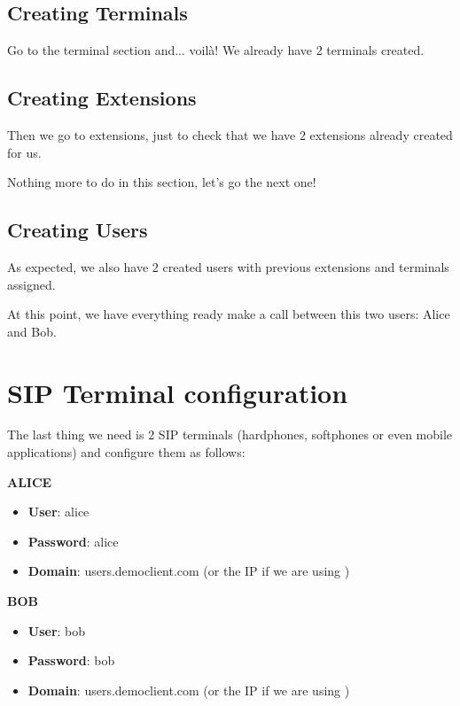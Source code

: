 \documentclass[letterpaper,10pt,english]{sphinxmanual}
\begin{document}
\subsection{Creating Terminals}
\label{getting_started/internal_calls/client_portal:creating-terminals}
Go to the terminal section and... voilà! We already have 2 terminals created.


\subsection{Creating Extensions}
\label{getting_started/internal_calls/client_portal:creating-extensions}
Then we go to extensions, just to check that we have 2 extensions already
created for us.

Nothing more to do in this section, let's go the next one!


\subsection{Creating Users}
\label{getting_started/internal_calls/client_portal:creating-users}
As expected, we also have 2 created users with previous extensions and terminals assigned.

At this point, we have everything ready make a call between this two users: Alice and Bob.


\section{SIP Terminal configuration}
\label{getting_started/internal_calls/configure_sipuacs:sip-terminal-configuration}\label{getting_started/internal_calls/configure_sipuacs::doc}
The last thing we need is 2 SIP terminals (hardphones, softphones or even
mobile applications) and configure them as follows:

\textbf{ALICE}
\begin{itemize}
\item {} 
\textbf{User}: alice

\item {} 
\textbf{Password}: alice

\item {} 
\textbf{Domain}: users.democlient.com (or the IP if we are using {\hyperref[getting_started/internal_calls/brand_portal:dnshack]{}})

\end{itemize}

\textbf{BOB}
\begin{itemize}
\item {} 
\textbf{User}: bob

\item {} 
\textbf{Password}: bob

\item {} 
\textbf{Domain}: users.democlient.com (or the IP if we are using {\hyperref[getting_started/internal_calls/brand_portal:dnshack]{}})

\end{itemize}
\end{document}
